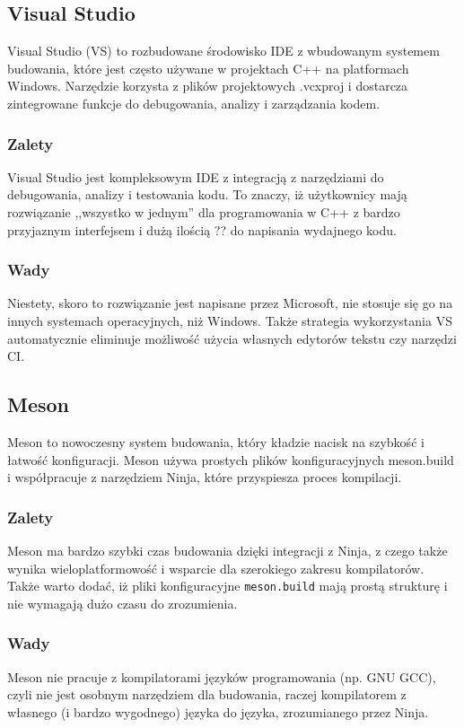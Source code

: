 \subsection{Visual Studio}
Visual Studio (VS) to rozbudowane środowisko IDE z wbudowanym systemem budowania, które jest często używane w projektach C++ na platformach Windows. Narzędzie korzysta z plików projektowych .vcxproj i dostarcza zintegrowane funkcje do debugowania, analizy i zarządzania kodem.

\subsubsection{Zalety}
Visual Studio jest kompleksowym IDE z integracją z narzędziami do debugowania, analizy i testowania kodu. To znaczy, iż użytkownicy mają rozwiązanie ,,wszystko w jednym'' dla programowania w C++ z bardzo przyjaznym interfejsem i dużą ilością ?? do napisania wydajnego kodu.

\subsubsection{Wady}
Niestety, skoro to rozwiązanie jest napisane przez Microsoft, nie stosuje się go na innych systemach operacyjnych, niż Windows. Także strategia wykorzystania VS automatycznie eliminuje możliwość użycia własnych edytorów tekstu czy narzędzi CI.

\subsection{Meson}
Meson to nowoczesny system budowania, który kładzie nacisk na szybkość i łatwość konfiguracji. Meson używa prostych plików konfiguracyjnych meson.build i współpracuje z narzędziem Ninja, które przyspiesza proces kompilacji.

\subsubsection{Zalety}
Meson ma bardzo szybki czas budowania dzięki integracji z Ninja, z czego także wynika wieloplatformowość i wsparcie dla szerokiego zakresu kompilatorów. Także warto dodać, iż  pliki konfiguracyjne \texttt{meson.build} mają prostą strukturę i nie wymagają dużo czasu do zrozumienia.

\subsubsection{Wady}
Meson nie pracuje z kompilatorami języków programowania (np. GNU GCC), czyli nie jest osobnym narzędziem dla budowania, raczej kompilatorem z własnego (i bardzo wygodnego) języka do języka, zrozumianego przez Ninja.

